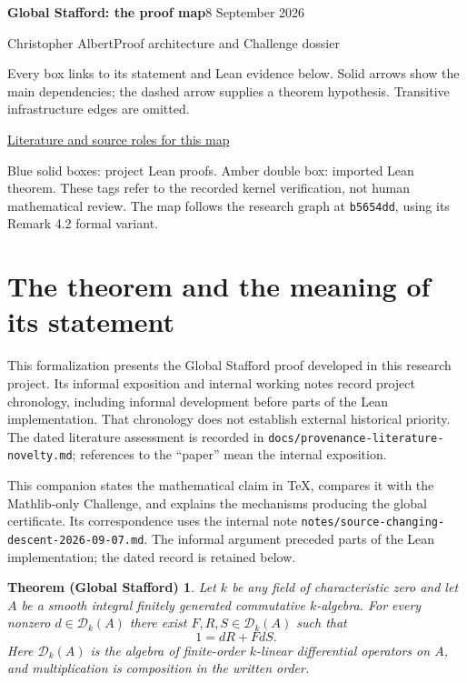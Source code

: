 \documentclass[11pt,a4paper]{article}
\newcommand{\code}[1]{\nolinkurl{#1}}
\newcommand{\D}{\mathcal D}
\newtheorem*{theorem}{Theorem (Global Stafford)}
\begin{document}
\begin{landscape}
\thispagestyle{empty}
\label{fig:map}
{\LARGE\bfseries Global Stafford: the proof map}\hfill 8 September 2026
\par\smallskip
\noindent Christopher Albert\quad\textcolor{ink}{\textbullet}\quad Proof architecture and Challenge dossier
\par\smallskip
\noindent\small Every box links to its statement and Lean evidence below. Solid arrows show the main dependencies;
 the dashed arrow supplies a theorem hypothesis. Transitive infrastructure edges are omitted.
\begin{center}

\par\smallskip\hyperref[sec:literature]{Literature and source roles for this map}\par
\end{center}
\noindent\small Blue solid boxes: project Lean proofs. Amber double box: imported Lean theorem.
These tags refer to the recorded kernel verification, not human mathematical review.
The map follows the research graph at \code{b5654dd}, using its Remark 4.2 formal variant.
\end{landscape}

\section{The theorem and the meaning of its statement}\label{sec:statement}
This formalization presents the Global Stafford proof developed in this
research project. Its informal exposition and internal working notes record
project chronology, including informal development before parts of the Lean
implementation. That chronology does not establish external historical priority.
The dated literature assessment is recorded in
\code{docs/provenance-literature-novelty.md}; references to the ``paper'' mean
the internal exposition.

This companion states the mathematical claim in TeX, compares it with the
Mathlib-only Challenge, and explains the mechanisms producing the global
certificate. Its correspondence uses the internal note
\code{notes/source-changing-descent-2026-09-07.md}. The informal argument
preceded parts of the Lean implementation; the dated record is retained below.

\begin{theorem}
Let $k$ be any field of characteristic zero and let $A$ be a smooth integral
finitely generated commutative $k$-algebra. For every nonzero
$d\in\D_k(A)$ there exist $F,R,S\in\D_k(A)$ such that
\[
                       1=dR+FdS.
\]
Here $\D_k(A)$ is the algebra of finite-order $k$-linear differential operators
on $A$, and multiplication is composition in the written order.
\end{theorem}
\end{document}
